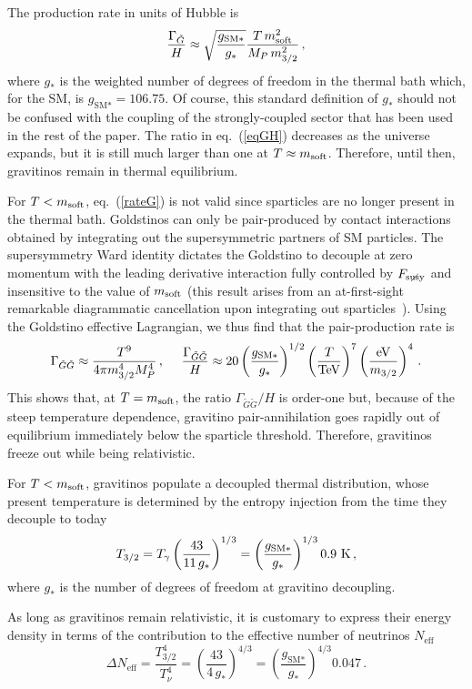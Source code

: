 \documentclass[a4paper,12pt]{article}
\newcommand{\beq}{\begin{equation}}
\newcommand{\eeq}{\end{equation}}
\def\eq#1{eq.~(\ref{#1})}
\def\eq#1{eq.~(\ref{#1})}
\def\Fs{F_ {{\rm susy}\! \! \! \! \! \! \! \!\diagup \,\,\,}}
\def\msoft{m_{\rm soft}}
\def\mgra{m_{3/2}}
\def\gSM{g_{\textrm{SM}*}}
\begin{document}
{{{{The production rate in units of Hubble is
\beq
\frac{\Gamma_{\tilde G}}{H} \approx \sqrt{\frac{\gSM}{g_*}}\frac{T\,\msoft^2}{M_P\,\mgra^2}\, ,
\label{eqGH}
\eeq
where $g_*$ is the weighted number of degrees of freedom in the thermal bath which, for the SM, is $\gSM=106.75$. Of course, this standard definition of $g_*$ should not be confused with the coupling of the strongly-coupled sector that has been used in the rest of the paper.
The ratio in \eq{eqGH} decreases as the universe expands, but it is still much larger than one at $T\approx \msoft$. Therefore, until then, gravitinos remain in thermal equilibrium.

For $T< \msoft$, \eq{rateG} is not valid since sparticles are no longer present in the thermal bath. Goldstinos can only be pair-produced by contact interactions obtained by integrating out the supersymmetric partners of SM particles. The supersymmetry Ward identity dictates the Goldstino to decouple at zero momentum with the leading derivative interaction fully controlled by $\Fs$ and  insensitive to the value of $\msoft$ (this result arises from an at-first-sight remarkable diagrammatic cancellation upon integrating out sparticles~\cite{Brignole:1997pe}). Using the Goldstino effective Lagrangian, we thus find that the pair-production rate is
\beq
\Gamma_{{\tilde G}{\tilde G}}  \approx \frac{T^9}{4\pi \mgra^4 M_P^4}
\, , ~~~~
\frac{\Gamma_{{\tilde G}{\tilde G}} }{H} \approx 20
\left( \frac{\gSM}{g_*}\right)^{1/2}  \left( \frac{T}{\rm TeV}\right)^7 \left( \frac{\rm eV}{\mgra} \right)^4\, .
\label{ratt}
\eeq
This shows that, at $T=\msoft$, the ratio $\Gamma_{{\tilde G}{\tilde G}} /H$  is order-one but, because of the steep temperature dependence, gravitino pair-annihilation goes rapidly out of equilibrium immediately below the sparticle threshold. Therefore, gravitinos freeze out while being relativistic.

For $T<\msoft$, gravitinos populate a decoupled thermal distribution, whose present temperature is determined by the entropy injection from the time they decouple to today
\beq
T_{3/2} = T_\gamma \left( \frac{43}{11\, g_*} \right)^{1/3}  = \left( \frac{\gSM}{g_*}\right)^{1/3}0.9~{\rm K}\, ,
\eeq
where $g_*$ is the number of degrees of freedom at gravitino decoupling.

As long as gravitinos remain relativistic, it is customary to express their energy density in terms of the contribution to the effective number of neutrinos $N_{\textrm{eff}}$
\beq
\Delta N_{\textrm{eff}} = \frac{T_{3/2}^4}{T_\nu^4}=\left( \frac{43}{4\,g_*}\right)^{4/3}= \left( \frac{\gSM}{g_*}\right)^{4/3} 0.047\, .
\label{deltn}
\eeq

}}}}
\end{document}
